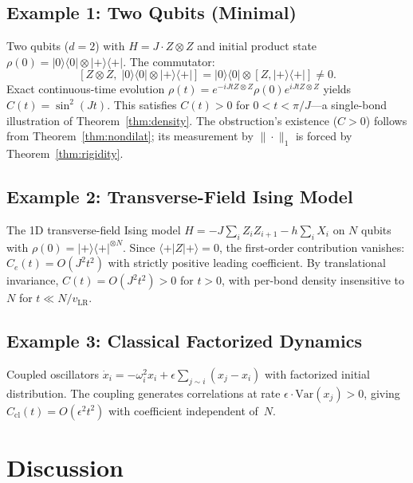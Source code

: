 \documentclass[12pt,a4paper]{amsart}
\theoremstyle{plain}
\theoremstyle{definition}
\theoremstyle{remark}
\begin{document}
\subsection{Example 1: Two Qubits (Minimal)}

Two qubits ($d = 2$) with $H = J \cdot Z \otimes Z$ and initial
product state
$\rho(0) = |{0}\rangle\langle{0}| \otimes |{+}\rangle\langle{+}|$.
The commutator:
\[
  [Z \otimes Z,\; |{0}\rangle\langle{0}| \otimes
  |{+}\rangle\langle{+}|]
  = |{0}\rangle\langle{0}| \otimes [Z, |{+}\rangle\langle{+}|]
  \neq 0.
\]
Exact continuous-time evolution
$\rho(t) = e^{-iJt Z \otimes Z} \rho(0) e^{iJt Z \otimes Z}$
yields $C(t) = \sin^2(Jt)$.
This satisfies $C(t) > 0$ for $0 < t < \pi/J$---a single-bond
illustration of Theorem~\ref{thm:density}. The obstruction's existence
($C > 0$) follows from Theorem~\ref{thm:nondilat}; its measurement by
$\|\cdot\|_1$ is forced by Theorem~\ref{thm:rigidity}.

\subsection{Example 2: Transverse-Field Ising Model}

The 1D transverse-field Ising model
$H = -J\sum_i Z_i Z_{i+1} - h\sum_i X_i$ on $N$ qubits with
$\rho(0) = |{+}\rangle\langle{+}|^{\otimes N}$. Since
$\langle{+}|Z|{+}\rangle = 0$, the first-order contribution vanishes:
$C_e(t) = O(J^2 t^2)$ with strictly positive leading coefficient. By
translational invariance, $C(t) = O(J^2 t^2) > 0$ for $t > 0$, with
per-bond density insensitive to $N$ for
$t \ll N/v_{\mathrm{LR}}$.

\subsection{Example 3: Classical Factorized Dynamics}

Coupled oscillators
$\dot{x}_i = -\omega_i^2 x_i + \epsilon \sum_{j \sim i}(x_j - x_i)$
with factorized initial distribution. The coupling generates
correlations at rate $\epsilon \cdot \mathrm{Var}(x_j) > 0$, giving
$C_{\mathrm{cl}}(t) = O(\epsilon^2 t^2)$ with coefficient independent
of~$N$.



\section{Discussion}\label{sec:discussion}
\end{document}

